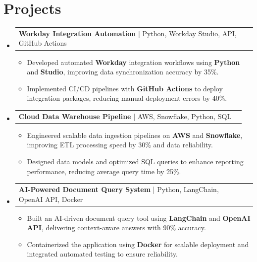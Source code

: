 \documentclass[letterpaper,11pt]{article}
\makeatletter
\newcommand{\resumeItem}[1]{
  \item\footnotesize{
    {#1 \vspace{-2pt}}
  }
}
\newcommand{\resumeProjectHeading}[2]{
    \item
    \begin{tabular*}{1.001\textwidth}{l@{\extracolsep{\fill}}r}
      \small#1 & \textbf{\small #2}\\
    \end{tabular*}\vspace{-7pt}
}
\newcommand{\resumeSubHeadingListStart}{\begin{itemize}[leftmargin=0pt, label={}]}
\newcommand{\resumeSubHeadingListEnd}{\end{itemize}}
\newcommand{\resumeItemListStart}{\begin{itemize}[leftmargin=*]}
\newcommand{\resumeItemListEnd}{\end{itemize}\vspace{-5pt}}
\makeatother
\begin{document}
\section{Projects}
    \vspace{-5pt}
    \resumeSubHeadingListStart

      \resumeProjectHeading
          {\textbf{Workday Integration Automation} | Python, Workday Studio, API, GitHub Actions}{ }
        \resumeItemListStart
            \resumeItem{Developed automated \textbf{Workday} integration workflows using \textbf{Python} and \textbf{Studio}, improving data synchronization accuracy by 35\%.}
            \resumeItem{Implemented CI/CD pipelines with \textbf{GitHub Actions} to deploy integration packages, reducing manual deployment errors by 40\%.}
        \resumeItemListEnd
        \vspace{-12pt}

      \resumeProjectHeading
          {\textbf{Cloud Data Warehouse Pipeline} | AWS, Snowflake, Python, SQL}{ }
        \resumeItemListStart
            \resumeItem{Engineered scalable data ingestion pipelines on \textbf{AWS} and \textbf{Snowflake}, improving ETL processing speed by 30\% and data reliability.}
            \resumeItem{Designed data models and optimized SQL queries to enhance reporting performance, reducing average query time by 25\%.}
        \resumeItemListEnd
        \vspace{-12pt}

      \resumeProjectHeading
          {\textbf{AI-Powered Document Query System} | Python, LangChain, OpenAI API, Docker}{ }
        \resumeItemListStart
            \resumeItem{Built an AI-driven document query tool using \textbf{LangChain} and \textbf{OpenAI API}, delivering context-aware answers with 90\% accuracy.}
            \resumeItem{Containerized the application using \textbf{Docker} for scalable deployment and integrated automated testing to ensure reliability.}
        \resumeItemListEnd

    \resumeSubHeadingListEnd
\end{document}
